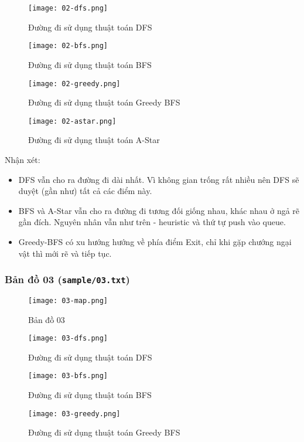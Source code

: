 \documentclass[12pt]{article}
\begin{document}
\begin{figure}[H]
	\centering
	\texttt{[image: 02-dfs.png]}
	\caption{Đường đi sử dụng thuật toán DFS}
\end{figure}

\begin{figure}[H]
	\centering
	\texttt{[image: 02-bfs.png]}
	\caption{Đường đi sử dụng thuật toán BFS}
\end{figure}

\begin{figure}[H]
	\centering
	\texttt{[image: 02-greedy.png]}
	\caption{Đường đi sử dụng thuật toán Greedy BFS}
\end{figure}

\begin{figure}[H]
	\centering
	\texttt{[image: 02-astar.png]}
	\caption{Đường đi sử dụng thuật toán A-Star}
\end{figure}

Nhận xét:
\begin{itemize}
\item DFS vẫn cho ra đường đi dài nhất. Vì không gian trống rất nhiều nên DFS sẽ duyệt (gần như) tất cả các điểm này.
\item BFS và A-Star vẫn cho ra đường đi tương đối giống nhau, khác nhau ở ngả rẽ gần đích. Nguyên nhân vẫn như trên - heuristic và thứ tự push vào queue.
\item Greedy-BFS có xu hướng hướng về phía điểm Exit, chỉ khi gặp chướng ngại vật thì mới rẽ và tiếp tục.
\end{itemize}

\subsubsection{Bản đồ 03 (\texttt{sample/03.txt})}
\begin{figure}[H]
	\centering
	\texttt{[image: 03-map.png]}
	\caption{Bản đồ 03}
\end{figure}

\begin{figure}[H]
	\centering
	\texttt{[image: 03-dfs.png]}
	\caption{Đường đi sử dụng thuật toán DFS}
\end{figure}

\begin{figure}[H]
	\centering
	\texttt{[image: 03-bfs.png]}
	\caption{Đường đi sử dụng thuật toán BFS}
\end{figure}

\begin{figure}[H]
	\centering
	\texttt{[image: 03-greedy.png]}
	\caption{Đường đi sử dụng thuật toán Greedy BFS}
\end{figure}
\end{document}
